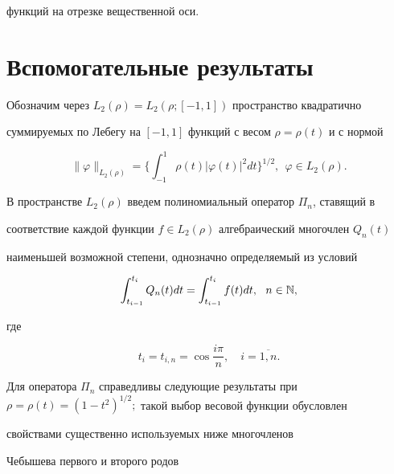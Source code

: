 функций на отрезке вещественной оси.





\section{Вспомогательные результаты}





Обозначим через $L_2(\rho)=L_2(\rho;[-1,1])$ пространство квадратично


суммируемых по Лебегу на $[-1,1]$ функций с весом $\rho=\rho(t)$ и с нормой


$$


\|\varphi\|_{L_2(\rho)}=\bigg\{


\int_{-1}^{1}\rho(t)|\varphi(t)|^2dt\bigg\}^{1/2},\ \ \varphi \in L_2(\rho).


$$





В пространстве $L_2(\rho)$ введем полиномиальный оператор $\Pi_n$, ставящий в


соответствие каждой функции $f\in L_2(\rho)$ алгебраический многочлен $Q_n(t)$


наименьшей возможной степени, однозначно определяемый из условий


\begin{equation}


\int_{t_{i-1}}^{t_i}Q_n(t)dt=\int_{t_{i-1}}^{t_i}f(t)dt, 


\ \ n\in\Bbb N,


\end{equation}


где


\begin{equation}


t_i=t_{i,n}=\cos \frac{i\pi}{n}, \quad i=\overline{1,n}.


\end{equation}





Для оператора $\Pi_n$ справедливы следующие результаты при $\rho=\rho(t)=


(1-t^2)^{1/2};$ такой выбор весовой функции обусловлен 


свойствами существенно используемых ниже многочленов


Чебышева первого и второго родов


$$


